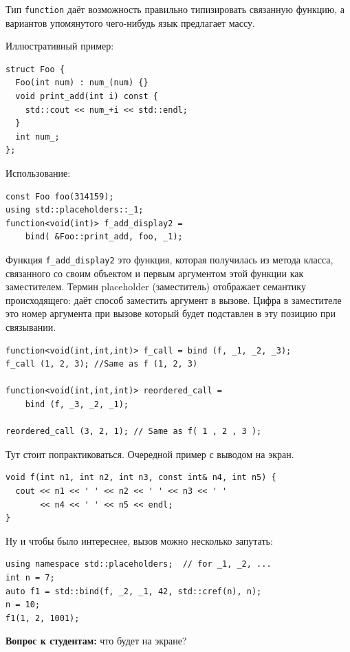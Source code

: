 \documentclass[a4paper,12pt,oneside]{book}
\begin{document}
Тип \lstinline!function! даёт возможность правильно типизировать связанную функцию, а вариантов упомянутого чего-нибудь язык предлагает массу.

Иллюстративный пример:

\begin{lstlisting}
struct Foo {
  Foo(int num) : num_(num) {}
  void print_add(int i) const { 
    std::cout << num_+i << std::endl; 
  }
  int num_;
};
\end{lstlisting}

Использование:

\begin{lstlisting}
const Foo foo(314159);
using std::placeholders::_1;
function<void(int)> f_add_display2 = 
    bind( &Foo::print_add, foo, _1);
\end{lstlisting}

Функция \lstinline!f_add_display2! это функция, которая получилась из метода класса, связанного со своим объектом и первым аргументом этой функции как заместителем. Термин placeholder (заместитель) отображает семантику происходящего: даёт способ заместить аргумент в вызове. Цифра в заместителе это номер аргумента при вызове который будет подставлен в эту позицию при связывании.

\begin{lstlisting}
function<void(int,int,int)> f_call = bind (f, _1, _2, _3);
f_call (1, 2, 3); //Same as f (1, 2, 3)

function<void(int,int,int)> reordered_call = 
    bind (f, _3, _2, _1);

reordered_call (3, 2, 1); // Same as f( 1 , 2 , 3 );
\end{lstlisting}

Тут стоит попрактиковаться. Очередной пример с выводом на экран.

\begin{lstlisting}
void f(int n1, int n2, int n3, const int& n4, int n5) {
  cout << n1 << ' ' << n2 << ' ' << n3 << ' ' 
       << n4 << ' ' << n5 << endl;
}
\end{lstlisting}

Ну и чтобы было интереснее, вызов можно несколько запутать:

\begin{lstlisting}
using namespace std::placeholders;  // for _1, _2, ...
int n = 7;
auto f1 = std::bind(f, _2, _1, 42, std::cref(n), n);
n = 10;
f1(1, 2, 1001); 
\end{lstlisting}

\textbf{Вопрос к студентам:} что будет на экране?
\end{document}
